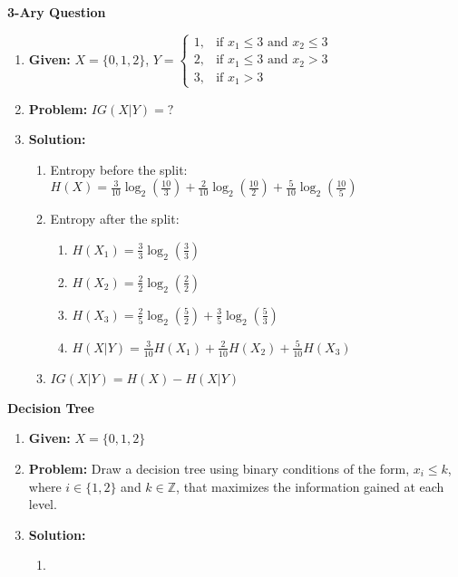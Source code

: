 \begin{example} \textbf{3-Ary Question}
    \begin{enumerate}
        \item \textbf{Given:} $X= \{0,1,2\}$, $Y = \begin{cases}
        1, & \text{if } x_1 \leq 3 \text{ and } x_2 \leq 3 \\
        2, & \text{if } x_1 \leq 3 \text{ and } x_2 > 3 \\
        3, & \text{if } x_1 > 3 
        \end{cases}$
        \item \textbf{Problem:} $IG(X|Y) = ?$
        \item \textbf{Solution:}
        \begin{enumerate}
            \item Entropy before the split: $H(X) = \frac{3}{10} \log_2\left(\frac{10}{3}\right) + \frac{2}{10} \log_2\left(\frac{10}{2}\right) + \frac{5}{10} \log_2\left(\frac{10}{5}\right)$
            \item Entropy after the split:
            \begin{enumerate}
                \item $H(X_1) = \frac{3}{3} \log_2\left(\frac{3}{3}\right)$
                \item $H(X_2) = \frac{2}{2} \log_2\left(\frac{2}{2}\right)$
                \item $H(X_3) = \frac{2}{5} \log_2\left(\frac{5}{2}\right) + \frac{3}{5} \log_2\left(\frac{5}{3}\right)$
                \item $H(X|Y) = \frac{3}{10} H(X_1) + \frac{2}{10} H(X_2) + \frac{5}{10} H(X_3)$
            \end{enumerate}
            \item $IG(X|Y) = H(X) - H(X|Y)$
        \end{enumerate}
    \end{enumerate}
\end{example}

\begin{example} \textbf{Decision Tree}
    \begin{enumerate}
        \item \textbf{Given:} $X= \{0,1,2\}$
        \item \textbf{Problem:} Draw a decision tree using binary conditions of the form, \(x_i \leq k\), where \(i \in \{1, 2\}\) and \(k \in \mathbb{Z}\), that maximizes the information gained at each level.
        \item \textbf{Solution:}
        \begin{enumerate}
            \item 
        \end{enumerate}
    \end{enumerate}
\end{example}

